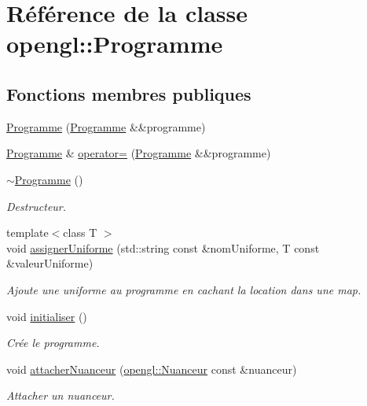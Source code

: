 \hypertarget{classopengl_1_1_programme}{\section{Référence de la classe opengl\-:\-:Programme}
\label{classopengl_1_1_programme}
}
\subsection*{Fonctions membres publiques}
\begin{DoxyCompactItemize}
\item 
\hyperlink{classopengl_1_1_programme_a34a14bec6952843fa70c64ef59e53a8e}{Programme} (\hyperlink{classopengl_1_1_programme}{Programme} \&\&programme)
\item 
\hyperlink{classopengl_1_1_programme}{Programme} \& \hyperlink{classopengl_1_1_programme_a48e706fe89b6fbaf3438bc3ce59b67a1}{operator=} (\hyperlink{classopengl_1_1_programme}{Programme} \&\&programme)
\item 
\hyperlink{classopengl_1_1_programme_a95cc4d2f20727b3328a398765c8e5414}{$\sim$\-Programme} ()
\begin{DoxyCompactList}\small\item\em Destructeur. \end{DoxyCompactList}\item 
{\footnotesize template$<$class T $>$ }\\void \hyperlink{classopengl_1_1_programme_a1912888bb4b273a4e6e046b32983721d}{assigner\-Uniforme} (std\-::string const \&nom\-Uniforme, T const \&valeur\-Uniforme)
\begin{DoxyCompactList}\small\item\em Ajoute une uniforme au programme en cachant la location dans une map. \end{DoxyCompactList}\item 
void \hyperlink{classopengl_1_1_programme_a93cde64c924d65725f477fe320cc38ca}{initialiser} ()
\begin{DoxyCompactList}\small\item\em Crée le programme. \end{DoxyCompactList}\item 
void \hyperlink{classopengl_1_1_programme_a001a0d8331575b6020ea4ae739f87927}{attacher\-Nuanceur} (\hyperlink{classopengl_1_1_nuanceur}{opengl\-::\-Nuanceur} const \&nuanceur)
\begin{DoxyCompactList}\small\item\em Attacher un nuanceur. \end{DoxyCompactList}\item 

\end{DoxyCompactItemize}
